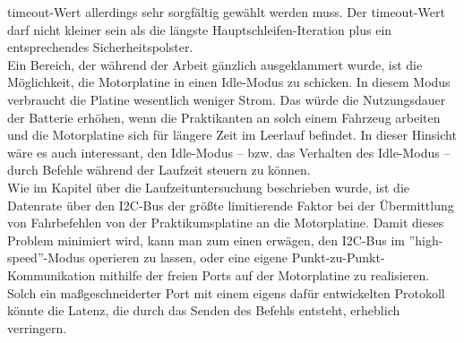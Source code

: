 timeout-Wert allerdings sehr sorgfältig gewählt werden muss. Der timeout-Wert darf nicht kleiner sein
als die längste Hauptschleifen-Iteration plus ein entsprechendes Sicherheitspolster.\\
Ein Bereich, der während der Arbeit gänzlich ausgeklammert wurde, ist die Möglichkeit, die
Motorplatine in einen Idle-Modus zu schicken. In diesem Modus verbraucht die Platine wesentlich weniger
Strom. Das würde die Nutzungsdauer der Batterie erhöhen, wenn die Praktikanten an solch einem Fahrzeug arbeiten
und die Motorplatine sich für längere Zeit im Leerlauf befindet. In dieser Hinsicht
wäre es auch interessant, den Idle-Modus -- bzw. das Verhalten des Idle-Modus -- durch Befehle während der
Laufzeit steuern zu können.\\
Wie im Kapitel über die Laufzeituntersuchung beschrieben wurde, ist die Datenrate über den I2C-Bus der größte
limitierende Faktor bei der Übermittlung von Fahrbefehlen von der Praktikumsplatine an die
Motorplatine. Damit dieses Problem minimiert wird, kann man zum einen erwägen, den I2C-Bus im
''high-speed''-Modus operieren zu lassen, oder eine eigene Punkt-zu-Punkt-Kommunikation mithilfe der freien Ports auf der
Motorplatine zu realisieren. Solch ein maßgeschneiderter Port mit einem eigens dafür entwickelten Protokoll
könnte die Latenz, die durch das Senden des Befehls entsteht, erheblich verringern.
